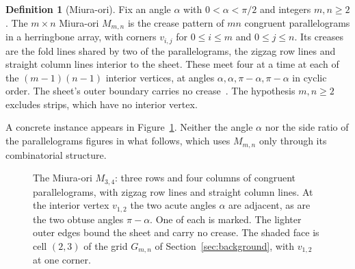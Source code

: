 \documentclass[11pt]{article}
\theoremstyle{definition}
\newtheorem{definition}[theorem]{Definition}
\theoremstyle{remark}
\newcommand{\Mm}{M_{m,n}}
\newcommand{\Gmn}{G_{m,n}}
\begin{document}
\begin{definition}[Miura-ori]\label{def:miura}
Fix an angle $\alpha$ with $0<\alpha<\pi/2$ and integers $m,n\ge2$. The $m\times n$ Miura-ori $\Mm$ is
the crease pattern of $mn$ congruent parallelograms in a herringbone array, with
corners $v_{i,j}$ for $0\le i\le m$ and $0\le j\le n$. Its creases are the fold
lines shared by two of the parallelograms, the zigzag row lines and straight
column lines interior to the sheet. These meet four at a time at each of the $(m-1)(n-1)$
interior vertices, at angles $\alpha,\alpha,\pi-\alpha,\pi-\alpha$ in cyclic
order. The sheet's outer boundary carries no
crease~\cite{GineproHull2014counting}. The hypothesis $m,n\ge2$ excludes strips, which have
no interior vertex.
\end{definition}

A concrete instance appears in Figure~\ref{fig:miura}. Neither the angle $\alpha$ nor
the side ratio of the parallelograms figures in what follows, which uses $\Mm$ only
through its combinatorial structure.

\begin{figure}[ht]
\centering
{}
\caption{The Miura-ori $M_{3,4}$: three rows and four columns of congruent
parallelograms, with zigzag row lines and straight column lines. At the interior
vertex $v_{1,2}$ the two acute angles $\alpha$ are adjacent, as are the two
obtuse angles $\pi-\alpha$. One of each is marked. The lighter outer edges bound
the sheet and carry no crease. The shaded face is cell
$(2,3)$ of the grid $\Gmn$ of Section~\ref{sec:background}, with $v_{1,2}$ at one
corner.}
\label{fig:miura}
\end{figure}
\end{document}
